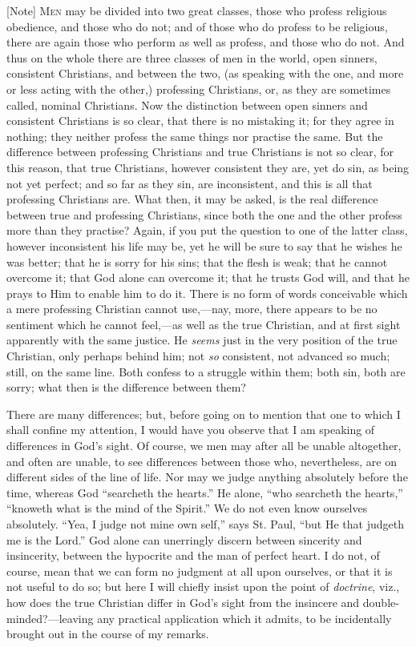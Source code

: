 [Note] M\textsc{en} may be divided into
two great classes, those who profess religious obedience, and those
who do not; and of those who do profess to be religious, there are
again those who perform as well as profess, and those who do not. And
thus on the whole there are three classes of men in the world, open
sinners, consistent Christians, and between the two, (as speaking with
the one, and more or less acting with the other,) professing
Christians, or, as they are sometimes called, nominal Christians. Now
the distinction between open sinners and consistent Christians is so
clear, that there is no mistaking it; for they agree in nothing; they
neither profess the same things nor practise the same. But the
difference between professing Christians and true Christians is not so
clear, for this reason, that true Christians, however consistent they
are, yet do sin, as being not yet perfect; and so far as they sin, are
inconsistent, and this is all that professing Christians are. What
then, it may be asked, is the real difference between true and
professing Christians, since both the one and the other profess more
than they practise? Again, if you put the question to one of the
latter class, however inconsistent his life may be, yet he will be
sure to say that he wishes he was better; that he is sorry for his
sins; that the flesh is weak; that he cannot overcome it; that God
alone can overcome it; that he trusts God will, and that he prays to
Him to enable him to do it. There is no form of words conceivable
which a mere professing Christian cannot use,—nay, more, there
appears to be no sentiment which he cannot feel,—as well as the true
Christian, and at first sight apparently with the same justice. He \emph{seems}
just in the very position of the true Christian, only perhaps behind
him; not \emph{so} consistent, not advanced so much; still, on the
same line. Both confess to a struggle within them; both sin, both are
sorry; what then is the difference between them?

There are many differences; but, before going on to mention that
one to which I shall confine my attention, I would have you observe
that I am speaking of differences in God's sight. Of course, we men
may after all be unable altogether, and often are unable, to see
differences between those who, nevertheless, are on different sides of
the line of life. Nor may we judge anything absolutely before the
time, whereas God ``searcheth the hearts.'' He alone, ``who
searcheth the hearts,'' ``knoweth what is the mind of the
Spirit.'' We do not even know ourselves absolutely. ``Yea, I
judge not mine own self,'' says St. Paul, ``but He that
judgeth me is the Lord.'' God alone can unerringly discern between
sincerity and insincerity, between the hypocrite and the man of
perfect heart. I do not, of course, mean that we can form no judgment
at all upon ourselves, or that it is not useful to do so; but here I
will chiefly insist upon the point of \emph{doctrine}, viz., how does
the true Christian differ in God's sight from the insincere and
double-minded?—leaving any practical application which it admits, to
be incidentally brought out in the course of my remarks.

